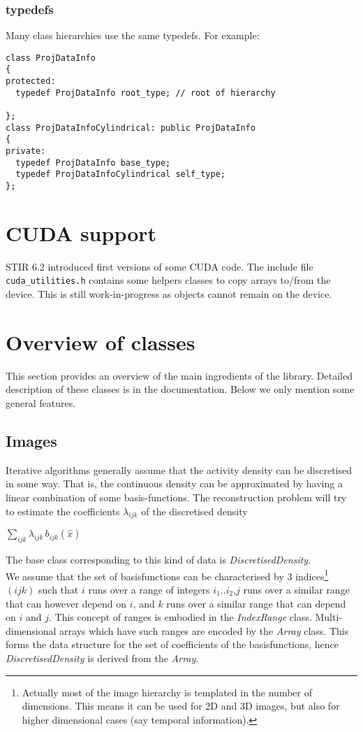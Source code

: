 \documentclass{article}
\begin{document}
\subsubsection{typedefs}
Many class hierarchies use the same typedefs. For example:
\begin{verbatim}
class ProjDataInfo
{
protected:
  typedef ProjDataInfo root_type; // root of hierarchy
  
};
class ProjDataInfoCylindrical: public ProjDataInfo
{
private:
  typedef ProjDataInfo base_type;
  typedef ProjDataInfoCylindrical self_type;
};
\end{verbatim}

\section{CUDA support}
STIR 6.2 introduced first versions of some CUDA code. The include file
\texttt{cuda\_utilities.h} contains some helpers classes to copy
arrays to/from the device. This is still work-in-progress as objects
cannot remain on the device.

\section{
Overview of classes}

This section provides an overview of the main ingredients of 
the library. Detailed description of these classes is in the documentation. 
Below we only mention some general features.



\subsection{
Images}

Iterative algorithms generally assume that the activity density 
can be discretised in some way. That is, the continuous density 
can be approximated by having a linear combination of some basis-functions. 
The reconstruction problem will try to estimate the coefficients $\lambda_{ijk}$ of 
the discretised density


$\sum_{ ijk}\lambda _{ijk} \,b_{ijk} (\widehat{x})  $

The base class corresponding to this kind of data is \textit{DiscretisedDensity.}\\
We assume that the set of basisfunctions can be characterised 
by 3 indices\footnote{{\small Actually most of the image hierarchy is 
templated in the number of dimensions. This means it can be used 
for 2D and 3D images, but also for higher dimensional cases (say 
temporal information).}} $(ijk)$ such that $i$ runs over a 
range of integers $i_1..i_2$,$j$ runs over a 
similar range that can however depend on $i$, and $k$ runs 
over a similar range that can depend on $i$ and $j$. 
This 
concept of ranges is embodied in the \textit{IndexRange} class. Multi-dimensional 
arrays which have such ranges are encoded by the \textit{Array} class. 
This forms the data structure for the set of coefficients of 
the basisfunctions, hence \textit{DiscretisedDensity} is derived from 
the \textit{Array}.
\end{document}
